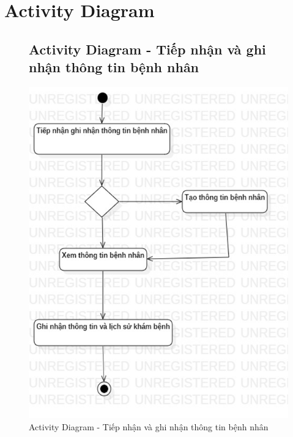 \documentclass{report}
\begin{document}
\section{Activity Diagram}
\begin{center}
	\begin{figure}[!htp]
		\subsection{Activity Diagram - Tiếp nhận và ghi nhận thông tin bệnh nhân}
		\begin{center}
			\includegraphics[scale=1]{Hinh/Activity diagram Tiếp nhận và ghi nhận thông tin bệnh nhân.png}
		\end{center}
		\caption{Activity Diagram - Tiếp nhận và ghi nhận thông tin bệnh nhân}
	\end{figure}
\end{center}
\end{document}
